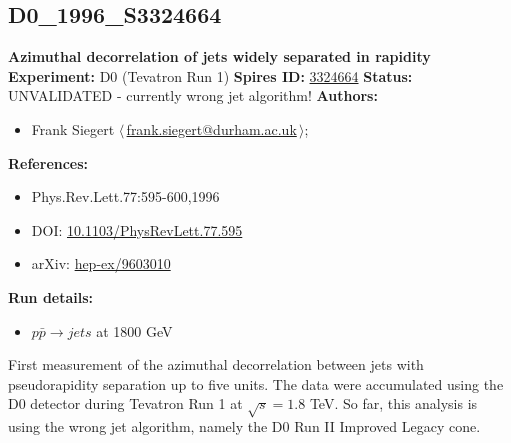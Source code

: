 \subsection[D0\_1996\_S3324664]{D0\_1996\_S3324664\,\cite{Abachi:1996et}}
\textbf{Azimuthal decorrelation of jets widely separated in rapidity}\newline
\textbf{Experiment:} D0 (Tevatron Run 1) \newline
\textbf{Spires ID:} \href{http://www.slac.stanford.edu/spires/find/hep/www?rawcmd=key+3324664}{3324664}\newline
\textbf{Status:} UNVALIDATED - currently wrong jet algorithm!\newline
\textbf{Authors:}
\begin{itemize}
  \item Frank Siegert $\langle\,$\href{mailto:frank.siegert@durham.ac.uk}{frank.siegert@durham.ac.uk}$\,\rangle$;
\end{itemize}
\textbf{References:}
\begin{itemize}
  \item Phys.Rev.Lett.77:595-600,1996
  \item DOI: \href{http://dx.doi.org/10.1103/PhysRevLett.77.595}{10.1103/PhysRevLett.77.595}
  \item arXiv: \href{http://arxiv.org/abs/hep-ex/9603010}{hep-ex/9603010}
\end{itemize}
\textbf{Run details:}
\begin{itemize}

  \item $p \bar{p} \to jets$ at 1800 GeV\end{itemize}

\noindent First measurement of the azimuthal decorrelation between jets with pseudorapidity separation up to five units. The data were accumulated using the D0 detector during Tevatron Run 1 at $\sqrt{s}=1.8$ TeV. So far, this analysis is using the wrong jet algorithm, namely the D0 Run II Improved Legacy cone.

\clearpage


\clearpage

